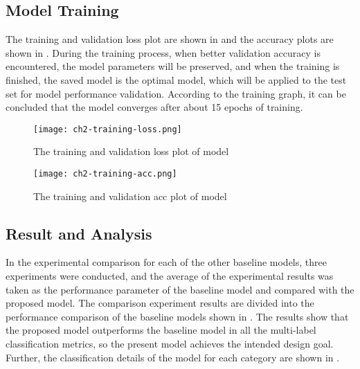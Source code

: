 \subsection{Model Training}
The training and validation loss plot are shown in \figname{\ref{fig:ch2-training-loss}} and the accuracy plots are shown in \figname{\ref{fig:ch2-training-acc}}. During the training process, when better validation accuracy is encountered, the model parameters will be preserved, and when the training is finished, the saved model is the optimal model, which will be applied to the test set for model performance validation. According to the training graph, it can be concluded that the model converges after about 15 epochs of training.
\begin{figure}[htb]
    \centering
    \texttt{[image: ch2-training-loss.png]}
    \caption{The training and validation loss plot of model}\label{fig:ch2-training-loss}
\end{figure}

\begin{figure}[htb]
    \centering
    \texttt{[image: ch2-training-acc.png]}
    \caption{The training and validation acc plot of model}\label{fig:ch2-training-acc}
\end{figure}

\subsection{Result and Analysis}
In the experimental comparison for each of the other baseline models, three experiments were conducted, and the average of the experimental results was taken as the performance parameter of the baseline model and compared with the proposed model. The comparison experiment results are divided into the performance comparison of the baseline models shown in \tblname{\ref{tbl:ch2-result-bsline1}}. The results show that the proposed model outperforms the baseline model in all the multi-label classification metrics, so the present model achieves the intended design goal. Further, the classification details of the model for each category are shown in \tblname{\ref{tbl:ch2-result-detail}}.

